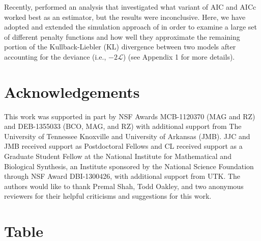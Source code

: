 \documentclass[onecolumn,letterpaper,fleqn,nogrid]{myMBE}%
\newcommand{\Lik}{\ensuremath{\mathcal{L}}\xspace}%
\begin{document}
Recently, \citet{Jhwuengetal2014} performed an analysis that investigated what variant of AIC and AICc worked best as an estimator, but the results were inconclusive.
Here, we have adopted and extended the simulation approach of \citet{Jhwuengetal2014} in order to examine a large set of different penalty functions and how well they approximate the remaining portion of the Kullback-Liebler (KL) divergence between two models after accounting for the deviance (i.e., $-2\Lik$) (see Appendix 1 for more details).






\section{Acknowledgements}
This work was supported in part by NSF Awards MCB-1120370 (MAG and RZ) and DEB-1355033 (BCO, MAG, and RZ) with additional support from The University of Tennessee Knoxville and University of Arkansas (JMB).
JJC and JMB received support as Postdoctoral Fellows and CL received support as a Graduate Student Fellow at the National Institute for Mathematical and Biological Synthesis, an Institute sponsored by the National Science Foundation through NSF Award DBI-1300426, with additional support from UTK.
The authors would like to thank Premal Shah, Todd Oakley, and two anonymous reviewers for their helpful criticisms and suggestions for this work.
\clearpage


%




\clearpage

\section{Table}
\end{document}
